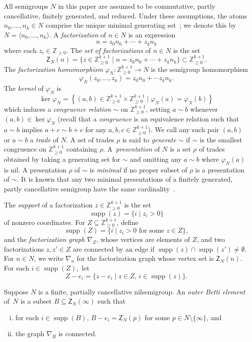 \documentclass[ALCO, Unicode]{cedram}
\newcommand\ZZ{\mathbb{Z}}
\newcommand\til{\mathord\sim}
\DeclareMathOperator\supp{supp}
\begin{document}
All semigroups $N$ in this paper are assumed to be commutative, partly cancellative, finitely generated, and reduced.  Under these assumptions, the atoms $n_0, \ldots, n_k \in N$ comprise the unique minimal generating set~\cite{fingenmon}; we denote this by $N = \langle  n_0, \ldots, n_k \rangle$.  A \emph{factorization} of $n \in N$ is an expression
\[
n = z_0n_0 + \cdots + z_kn_k  
\]
where each $z_i \in \ZZ_{\geq 0}$. The \emph{set of factorizations} of $n \in N$ is the set
\[
\mathsf{Z}_N(n) = \{z \in \ZZ_{\geq 0}^{k+1} \mid n = z_0n_0 + \cdots + z_kn_k\} \subset \ZZ_{\geq 0}^{k+1}.
\]
The \emph{factorization homomorphism} $\varphi_N : \ZZ_{\geq 0}^{k+1} \to N$ is the semigroup homomorphism 
\[
\varphi_N(z_0,\ldots, z_k) = z_0n_0 + \cdots z_kn_k.
\]
The \emph{kernel} of $\varphi_N$ is 
\[
\ker \varphi_N = \left\{ (a,b) \in \ZZ_{\geq 0}^{k+1} \times \ZZ_{\geq 0}^{k+1} \mid \varphi_N(a) = \varphi_N(b) \right\}  
\]
which induces a \emph{congruence relation} $\til$ on $\ZZ_{\geq 0}^{k+1}$, setting $a \sim b$ whenever $(a,b) \in \ker \varphi_N$ (recall that a \emph{congruence} is an equivalence relation such that $a \sim b$ implies $a+c \sim b+c$ for any $a,b,c \in \ZZ_{\geq 0}^{k+1}$).  We call any such pair $(a,b)$ or $a \sim b$ a \emph{trade} of $N$.  
A set of trades $\rho$ is said to \emph{generate} $\til$ if $\til$ is the smallest congruence on $\ZZ_{\geq 0}^{k+1}$ containing $\rho$.  A~\emph{presentation} of $N$ is a set $\rho$ of trades obtained by taking a generating set for $\til$ and omitting any $a \sim b$ where $\varphi_N(a)$ is nil.  A presentation $\rho$ of $\til$ is \emph{minimal} if no proper subset of $\rho$ is a presentation of $\til$.  It is known that any two minimal presentations of a finitely generated, partly cancellative semigroup have the same cardinality~\cite{kunzfaces3,fingenmon}.  

The \emph{support} of a factorization $ z \in \ZZ_{\geq 0}^{k+1}$ is the set 
$$\supp(z) = \{i \mid z_i > 0\}$$
of nonzero coordinates.  For $Z \subseteq \ZZ_{\geq 0}^{k+1}$, define 
$$\supp(Z) = \{i \mid z_i > 0 \text{ for some } z \in Z\},$$
and the \emph{factorization graph} $\nabla_Z$, whose vertices are elements of $Z$, and two factorizations $z, z' \in Z$ are connected by an edge if $\supp(z) \cap \supp(z') \ne \emptyset$. For $n \in N$, we write $\nabla_n$ for the factorization graph whose vertex set is $\mathsf Z_N(n)$.  For each $i \in \supp(Z)$,~let
\[
Z - e_i = \{z-e_i \mid z \in Z, \, i \in \supp(z)\}.
\]

Suppose $N$ is a finite, partially cancellative nilsemigroup.  An \emph{outer Betti element} of~$N$ is a subset $B \subseteq \mathsf{Z}_N(\infty)$ such that
\begin{enumerate}[(i)]
\item for each $i \in \supp(B)$, $B - e_i = \mathsf{Z}_N(p)$ for some $p \in N \setminus \{\infty\}$, and
\item the graph $\nabla_B$ is connected.
\end{enumerate}
\end{document}
